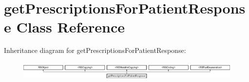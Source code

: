 \hypertarget{interfaceget_prescriptions_for_patient_response}{}\section{get\+Prescriptions\+For\+Patient\+Response Class Reference}
\label{interfaceget_prescriptions_for_patient_response}
Inheritance diagram for get\+Prescriptions\+For\+Patient\+Response\+:\begin{figure}[H]
\begin{center}
\leavevmode
\includegraphics[height=1.000000cm]{interfaceget_prescriptions_for_patient_response}
\end{center}
\end{figure}
